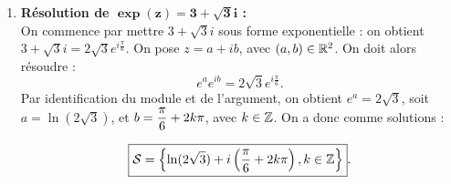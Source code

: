 \documentclass[a4paper, 11pt]{article}
\begin{document}
\begin{correction}
\begin{enumerate}
\item \textbf{R\'esolution de $\mathbf{\exp(z)=3+\sqrt{3}i}$ :}\\
On commence par mettre $3+\sqrt{3}i$ sous forme exponentielle : on obtient $3+\sqrt{3}i=2\sqrt{3} e^{i \frac{\pi}{6}}$. On pose $z=a+ib$, avec $(a,b)\in \mathbb{R}^2$. On doit alors r\'esoudre :
$$e^a e^{ib} = 2\sqrt{3} e^{i \frac{\pi}{6}}.$$
Par identification du module et de l'argument, on obtient $e^a=2\sqrt{3}$, soit $a = \ln(2\sqrt{3})$, et $b=\displaystyle \frac{\pi}{6} + 2k \pi$, avec $k \in \mathbb{Z}$. On a donc comme solutions : 

$$\fbox{$\displaystyle \mathcal{S} = \left\{ \ln(2\sqrt{3}) + i \left(\frac{\pi}{6} + 2k \pi\right),k \in \mathbb{Z}\right\}$}.$$
\end{enumerate}
\end{correction}
\end{document}

